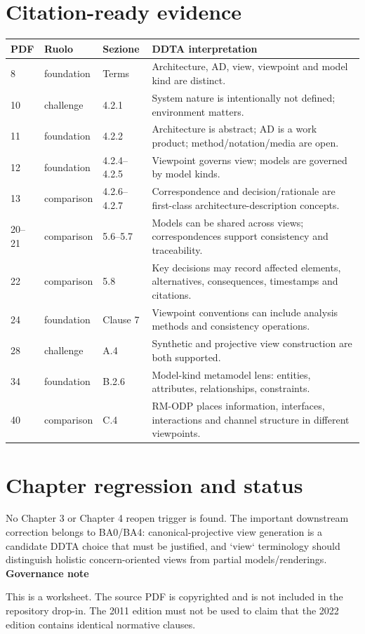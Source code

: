 \documentclass[10pt,a4paper]{article}
\newenvironment{challenge}[1]{\def\FrameCommand{\fcolorbox{ddtaorange}{ddtagray}}\MakeFramed{\advance\hsize-2\width\FrameRestore}\noindent\textbf{#1}\par\smallskip}{\endMakeFramed}
\begin{document}
\section{Citation-ready evidence}
\begin{longtable}{p{1.0cm}p{2.1cm}p{4.0cm}p{7.4cm}}
\toprule PDF & Ruolo & Sezione & DDTA interpretation\\\midrule\endhead
8 & foundation & Terms & Architecture, AD, view, viewpoint and model kind are distinct.\\
10 & challenge & 4.2.1 & System nature is intentionally not defined; environment matters.\\
11 & foundation & 4.2.2 & Architecture is abstract; AD is a work product; method/notation/media are open.\\
12 & foundation & 4.2.4--4.2.5 & Viewpoint governs view; models are governed by model kinds.\\
13 & comparison & 4.2.6--4.2.7 & Correspondence and decision/rationale are first-class architecture-description concepts.\\
20--21 & comparison & 5.6--5.7 & Models can be shared across views; correspondences support consistency and traceability.\\
22 & comparison & 5.8 & Key decisions may record affected elements, alternatives, consequences, timestamps and citations.\\
24 & foundation & Clause 7 & Viewpoint conventions can include analysis methods and consistency operations.\\
28 & challenge & A.4 & Synthetic and projective view construction are both supported.\\
34 & foundation & B.2.6 & Model-kind metamodel lens: entities, attributes, relationships, constraints.\\
40 & comparison & C.4 & RM-ODP places information, interfaces, interactions and channel structure in different viewpoints.\\
\bottomrule\end{longtable}
\section{Chapter regression and status}
No Chapter 3 or Chapter 4 reopen trigger is found. The important downstream correction belongs to BA0/BA4: canonical-projective view generation is a candidate DDTA choice that must be justified, and `view` terminology should distinguish holistic concern-oriented views from partial models/renderings.
\begin{challenge}{Governance note}
This is a worksheet. The source PDF is copyrighted and is not included in the repository drop-in. The 2011 edition must not be used to claim that the 2022 edition contains identical normative clauses.
\end{challenge}
\end{document}
